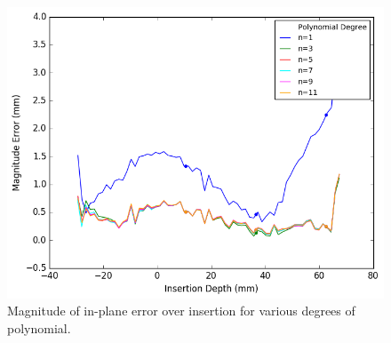 \begin{figure}[h]
\includegraphics[width=1.0\textwidth]{Fig/chap5/errors_polynomials.png}
\caption{Magnitude of in-plane error over insertion for various degrees of polynomial.}
\label{fig:results_error_comparison}
\end{figure}





